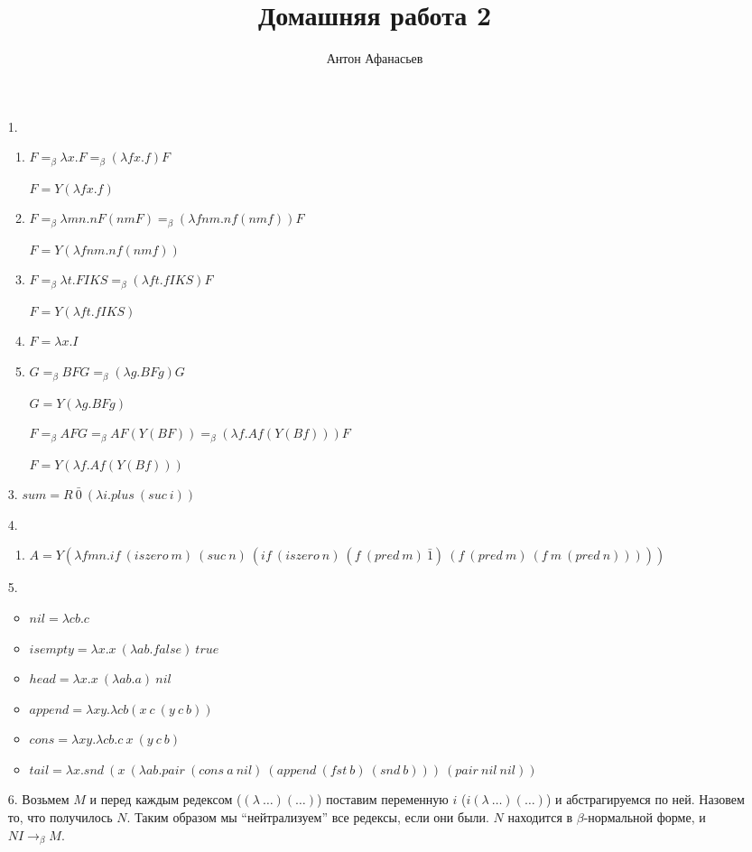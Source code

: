 \documentclass[10pt]{article}
\newcommand{\eb}{=_\beta}
\newcommand{\tob}{\to_\beta}
\begin{document}
\title{Домашняя работа 2}
\author{Антон Афанасьев}
\maketitle

\begin{enumerate}
	\item[1.]
	\begin{enumerate}
		\item $F \eb \lambda x.F \eb (\lambda fx.f)F$
		
		 $F = Y(\lambda fx. f)$
		 
		\item $F \eb \lambda mn.nF(nmF) \eb (\lambda fnm.nf(nmf))F$
		
		$F = Y(\lambda fnm.nf(nmf))$
		
		\item $F \eb \lambda t. FIKS \eb (\lambda ft. fIKS)F$
		
		$F = Y(\lambda ft.fIKS)$
		
		\item $F = \lambda x. I$
		
		\item $G \eb BFG \eb (\lambda g. BFg)G$
		
		$G = Y(\lambda g.BFg)$
		
		$F \eb AFG \eb AF(Y(BF)) \eb (\lambda f.Af(Y(Bf)))F$
		
		$F = Y(\lambda f. Af(Y(Bf)))$
	\end{enumerate}
	
	\item[3.] $sum = R\ \bar 0\ (\lambda i. plus\ (suc\ i))$
	
	\item[4.]
	\begin{enumerate}
		\item $A = Y(\lambda fmn. if\ (iszero\ m)\ (suc\ n)\ (if\ (iszero\ n)\ (f\ (pred\ m)\ \bar 1)\ (f\ (pred\ m)\ (f\ m\ (pred\ n)))))$
	\end{enumerate}
	
	\item[5.]
	\begin{itemize}
		\item $nil = \lambda cb.c$
		\item $isempty = \lambda x.x\ (\lambda ab.false)\ true$
		\item $head = \lambda x. x\ (\lambda ab.a)\ nil$
		\item $append = \lambda xy. \lambda cb(x\ c\ (y\ c\ b))$
		\item $cons = \lambda xy. \lambda cb.c\ x\ (y\ c\ b)$
		\item $tail = \lambda x. snd\ (x\ (\lambda ab.pair\ (cons\ a\ nil)\ (append\ (fst\ b)\ (snd\ b)))\ (pair\ nil\ nil))$
	\end{itemize}
	
	\item[6.] Возьмем $M$ и перед каждым редексом ($(\lambda\ \ldots)(\ldots)$) поставим переменную $i$ ($i(\lambda\ \ldots)(\ldots)$) и абстрагируемся по ней. Назовем то, что получилось $N$. Таким образом мы ``нейтрализуем'' все редексы, если они были. $N$ находится в $\beta$-нормальной форме, и $NI \tob M$.
\end{enumerate}
\end{document}
